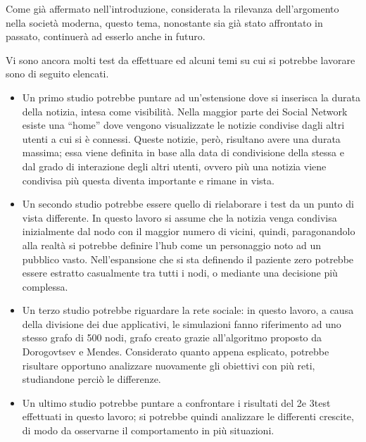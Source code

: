 Come già affermato nell'introduzione, considerata la rilevanza dell'argomento nella società moderna,
questo tema, nonostante sia già stato affrontato in passato, continuerà ad esserlo anche in futuro.

Vi sono ancora molti test da effettuare ed alcuni temi su cui si potrebbe lavorare sono di seguito elencati.
\begin{itemize}
 \item Un primo studio potrebbe puntare ad un'estensione dove si inserisca la durata della notizia, intesa come visibilità. 
 Nella maggior parte dei Social Network esiste una ``home'' dove vengono visualizzate le notizie 
 condivise dagli altri utenti a cui si è connessi.
 Queste notizie, però, risultano avere una durata massima; essa viene definita in base alla data di condivisione della stessa e
 dal grado di interazione degli altri utenti, ovvero più una notizia viene condivisa più questa diventa importante e rimane in vista.
 
 \item Un secondo studio potrebbe essere quello di rielaborare i test da un punto di vista differente. 
 In questo lavoro si assume che la notizia venga condivisa inizialmente dal nodo con il maggior numero di vicini, quindi, 
 paragonandolo alla realtà si potrebbe definire l'hub come un personaggio noto ad un pubblico vasto.
 Nell'espansione che si sta definendo il paziente zero potrebbe essere estratto casualmente tra tutti i nodi, o mediante una decisione più complessa.
 
 \item Un terzo studio potrebbe riguardare la rete sociale: in questo lavoro, a causa della divisione dei due applicativi, 
 le simulazioni fanno riferimento ad uno stesso grafo di 500 nodi, grafo creato grazie all'algoritmo proposto da Dorogovtsev e Mendes. 
 Considerato quanto appena esplicato, potrebbe risultare opportuno analizzare nuovamente gli obiettivi con più reti, studiandone perciò le differenze.
 
 \item Un ultimo studio potrebbe puntare a confrontare i risultati del 2\degree e 3\degree test effettuati in questo lavoro;  
 si potrebbe quindi analizzare le differenti crescite, di modo da osservarne il comportamento in più situazioni. 
\end{itemize}














